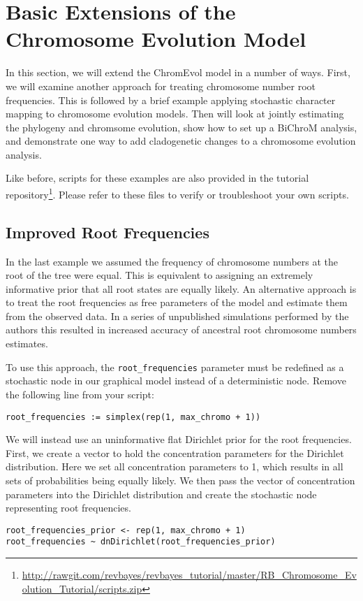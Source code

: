 \section{Basic Extensions of the Chromosome Evolution Model}\label{sec:chromo_extensions}

In this section, we will extend the ChromEvol model in a number of ways.
First, we will examine another approach for treating chromosome number root frequencies.
This is followed by a brief example applying stochastic character mapping to chromosome evolution
models.
Then will look at jointly estimating the phylogeny and chromsome evolution,
show how to set up a BiChroM analysis, and demonstrate one way to add cladogenetic changes
to a chromosome evolution analysis.

Like before, scripts for these examples are also provided in the \RevBayes tutorial repository\footnote{\url{http://rawgit.com/revbayes/revbayes_tutorial/master/RB_Chromosome_Evolution_Tutorial/scripts.zip}}. 
Please refer to these files to verify or troubleshoot your own scripts. 

\bigskip
\subsection{Improved Root Frequencies}\label{subsect:root_freq}

In the last example we assumed the frequency of chromosome numbers at the root of the tree
were equal. This is equivalent to assigning an extremely informative prior that all root states
are equally likely.
An alternative approach is to treat the root frequencies
as free parameters of the model and estimate them from the observed data.
In a series of unpublished simulations performed by the authors this resulted in increased accuracy of 
ancestral root chromosome numbers estimates. 


To use this approach, the \texttt{root\_frequencies} parameter must be redefined
as a stochastic node in our graphical model instead of a deterministic node.
Remove the following line from your \Rev script:
{\tt \begin{snugshade*}
\begin{lstlisting}
root_frequencies := simplex(rep(1, max_chromo + 1))
\end{lstlisting}
\end{snugshade*}}

We will instead use an uninformative flat Dirichlet prior for the root frequencies.
First, we create a vector to hold the concentration parameters for the Dirichlet
distribution. Here we set all concentration parameters to 1, which results in all
sets of probabilities being equally likely.
We then pass the vector of concentration parameters into the Dirichlet distribution
and create the stochastic node representing root frequencies.
{\tt \begin{snugshade*}
\begin{lstlisting}
root_frequencies_prior <- rep(1, max_chromo + 1)
root_frequencies ~ dnDirichlet(root_frequencies_prior)
\end{lstlisting}
\end{snugshade*}}

